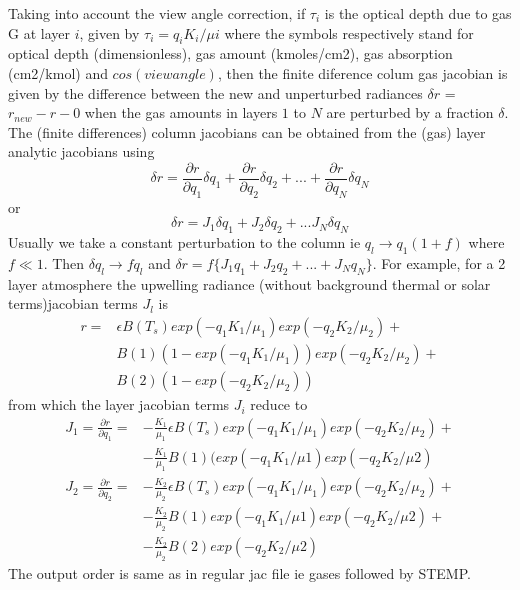 \documentclass[12pt]{article}
\begin{document}
Taking into account the view angle correction, if $\tau_{i}$ is the optical 
depth due to gas G at layer $i$, given by $\tau_{i} = q_{i} K_{i}/\mu{i}$ 
where the symbols respectively stand for optical depth (dimensionless), gas 
amount (kmoles/cm2), gas absorption (cm2/kmol) and $cos(view angle)$, then 
the finite diference colum gas jacobian is 
given by the difference between the new and unperturbed radiances 
$\delta r$ = $r_{new} - r-{0}$ when the gas amounts in layers $1$ to $N$ are 
perturbed by a fraction $\delta$. The (finite differences) column jacobians 
can be obtained from the (gas) layer analytic jacobians using
\[
\delta r = \frac{\partial r}{\partial q_1} \delta q_1 + 
           \frac{\partial r}{\partial q_2} \delta q_2 + ... + 
           \frac{\partial r}{\partial q_N} \delta q_N
\] 
or 
\[
\delta r = J_{1} \delta q_1 + J_{2} \delta q_2 + ...
               J_{N} \delta q_N
\]
Usually we take a constant perturbation to the column ie $q_{l} \rightarrow 
q_{1}(1 + f)$ where $f \ll 1$. Then $\delta q_{l} \rightarrow f q_{l}$ and
$\delta r = f \{ J_{1} q_1 + J_{2} q_2 + ... + J_{N} q_N \} $. For example, 
for a 2 layer atmosphere the upwelling radiance (without background thermal 
or solar terms)jacobian terms $J_{l}$ is 
\begin{eqnarray*}
r = & \epsilon B(T_{s}) exp(-q_{1} K_{1}/\mu_{1})exp(-q_{2} K_{2}/\mu_{2}) +\\
    & B(1)(1-exp(-q_{1} K_{1}/\mu_{1}))exp(-q_{2} K_{2}/\mu_{2}) + \\
    & B(2)(1-exp(-q_{2} K_{2}/\mu_{2}))
\end{eqnarray*}
from which the layer jacobian terms $J_{i}$ reduce to
\begin{eqnarray*}
J_{1} = \frac{\partial r}{\partial q_1} = & 
 -\frac{K_1}{\mu_1}\epsilon B(T_{s})exp(-q_1 K_1/\mu_1)exp(-q_2 K_2/\mu_2) + \\
&-\frac{K_1}{\mu_1} B(1)(exp(-q_{1} K_{1}/\mu{1})exp(-q_{2} K_{2}/\mu{2})
\end{eqnarray*}
\begin{eqnarray*}
J_{2} = \frac{\partial r}{\partial q_2} = & 
-\frac{K_2}{\mu_2}\epsilon B(T_{s})exp(-q_1 K_1/\mu_1)exp(-q_2 K_2/\mu_2) + \\
& -\frac{K_2}{\mu_2} B(1)exp(-q_{1} K_{1}/\mu{1})exp(-q_{2} K_{2}/\mu{2}) + \\
& -\frac{K_2}{\mu_2} B(2)exp(-q_{2} K_{2}/\mu{2})
\end{eqnarray*}
The output order is same as in regular jac file ie gases followed by STEMP.
\end{document}
